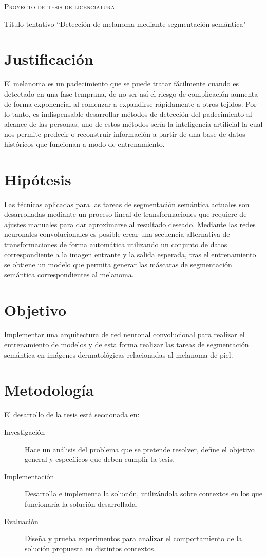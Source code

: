 \documentclass{article}
\begin{document}
\begin{center} {\scshape\LARGE Proyecto de tesis de licenciatura \par} \end{center}
Titulo tentativo   ``Detección de melanoma mediante segmentación semántica"

\section*{Justificación}
El melanoma es un padecimiento que se puede tratar fácilmente cuando es detectado en una fase temprana, de no ser así el riesgo de complicación aumenta de forma exponencial al comenzar a expandirse rápidamente a otros tejidos. Por lo tanto, es indispensable desarrollar métodos de detección del padecimiento al alcance de las personas, uno de estos métodos sería la inteligencia artificial la cual nos permite predecir o reconstruir información a partir de una base de datos históricos que funcionan a modo de entrenamiento.

\section*{Hipótesis}
Las técnicas aplicadas para las tareas de segmentación semántica actuales son desarrolladas mediante un proceso lineal de transformaciones que requiere de ajustes manuales para dar aproximarse al resultado deseado. Mediante las redes neuronales convolucionales es posible crear una secuencia alternativa de transformaciones de forma automática utilizando un conjunto de datos correspondiente a la imagen entrante y la salida esperada, tras el entrenamiento se obtiene un modelo que permita generar las máscaras de segmentación semántica correspondientes al melanoma.

\section*{Objetivo}
Implementar una arquitectura de red neuronal convolucional para realizar el entrenamiento de modelos y de esta forma realizar las tareas de segmentación semántica en imágenes dermatológicas relacionadas al melanoma de piel.

\section*{Metodología}
El desarrollo de la tesis está seccionada en:

\begin{description}
\item[Investigación]{Hace un análisis del problema que se pretende resolver, define el objetivo general y específicos que deben cumplir la tesis.}

\item[Implementación]{Desarrolla e implementa la solución, utilizándola sobre contextos en los que funcionaría la solución desarrollada. }

\item[Evaluación]{Diseña y prueba experimentos para analizar el comportamiento de la solución propuesta en distintos contextos.}

\end{description}
\end{document}
